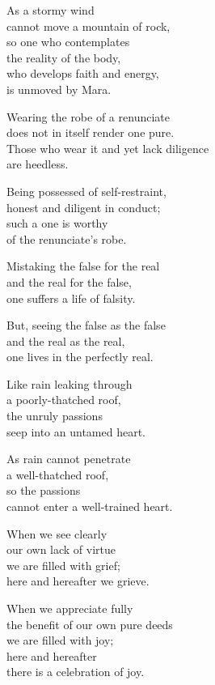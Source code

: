 As a stormy wind\\
cannot move a mountain of rock,\\
so one who contemplates\\
the reality of the body,\\
who develops faith and energy,\\
is unmoved by Mara.

Wearing the robe of a renunciate\\
does not in itself render one pure.\\
Those who wear it and yet lack diligence\\
are heedless.

Being possessed of self-restraint,\\
honest and diligent in conduct;\\
such a one is worthy\\
of the renunciate's robe.


Mistaking the false for the real\\
and the real for the false,\\
one suffers a life of falsity.


But, seeing the false as the false\\
and the real as the real,\\
one lives in the perfectly real.


Like rain leaking through\\
a poorly-thatched roof,\\
the unruly passions\\
seep into an untamed heart.


As rain cannot penetrate\\
a well-thatched roof,\\
so the passions\\
cannot enter a well-trained heart.


When we see clearly\\
our own lack of virtue\\
we are filled with grief;\\
here and hereafter we grieve.


When we appreciate fully\\
the benefit of our own pure deeds\\
we are filled with joy;\\
here and hereafter\\
there is a celebration of joy.

